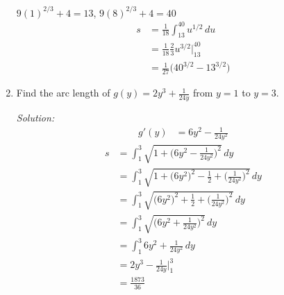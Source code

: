\documentclass[16pt]{article}
\theoremstyle{remark}
\begin{document}
\begin{enumerate}
\begin{mdframed}[style=TheoremFrame]
$9(1)^{2/3} + 4 = 13$, $9(8)^{2/3}+4=40$
\begin{align*}
s &= \frac{1}{18}\int_{13}^{40} u^{1/2} \,du\\
&= \frac{1}{18}\frac{2}{3} u^{3/2} \bigg|_{13}^{40}\\
&= \frac{1}{27}\bigg(40^{3/2}-13^{3/2}\bigg)
\end{align*}
\end{mdframed}
\newpage
\item Find the arc length of $\displaystyle{g(y) = 2y^3 + \frac{1}{24y}}$ from $y=1$ to $y=3$.
\begin{mdframed}[style=TheoremFrame]
\textit{Solution:}
\begin{align*}
g'(y) &= 6y^2 - \frac{1}{24y^2}
\end{align*}
\begin{align*}
s &= \int_1^3 \sqrt{1+\bigg(6y^2-\frac{1}{24y^2}\bigg)^2}\, dy\\
&= \int_1^3 \sqrt{1+\big(6y^2\big)^2-\frac{1}{2}+\bigg(\frac{1}{24y^2}\bigg)^2}\, dy\\
&= \int_1^3 \sqrt{\big(6y^2\big)^2+\frac{1}{2}+\bigg(\frac{1}{24y^2}\bigg)^2}\, dy\\
&= \int_1^3 \sqrt{\bigg(6y^2+\frac{1}{24y^2}\bigg)^2}\, dy\\
&= \int_1^3 6y^2+\frac{1}{24y^2}\, dy\\
&= 2y^3 - \frac{1}{24y} \bigg|_1^3\\
&= \frac{1873}{36}
\end{align*}

\end{mdframed}
\end{enumerate}
\end{document}
